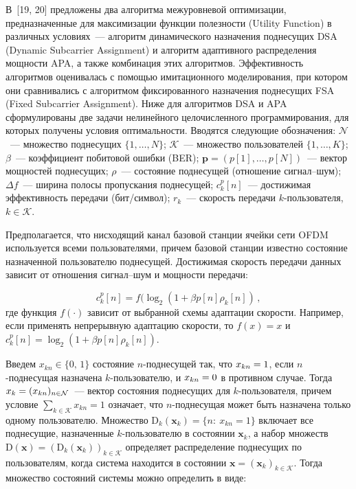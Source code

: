 \begin{multicols}{2}
  В~[19, 20] предложены два алгоритма межуровневой оптимизации, предназначенные для 
максимизации функции полезности (Utility Function) в различных условиях~--- алгоритм 
динамического назначения поднесущих DSA (Dynamic Subcarrier Assignment) и 
алгоритм адаптивного распределения мощности APA, а 
также комбинация этих алгоритмов. Эффективность алгоритмов оценивалась с помощью 
имитационного моделирования, при котором они сравнивались с алгоритмом 
фиксированного назначения поднесущих FSA (Fixed Subcarrier Assignment). Ниже для 
алгоритмов DSA и APA сформулированы две задачи нелинейного целочисленного 
программирования, для которых получены условия оптимальности. Вводятся следующие 
обозначения: $\mathcal{N}$~--- множество поднесущих $\{1,\ldots ,N\}$; 
$\mathcal{K}$~--- множество пользователей $\{1,\ldots ,K\}$; $\beta$~--- коэффициент 
побитовой ошибки (BER); $\mathbf{p}=(p[1],\ldots ,p[N])$~--- вектор мощностей\linebreak 
поднесущих; $\rho$~--- состояние поднесущей (отношение сиг\-нал--шум); $\Delta f$~--- 
ширина полосы пропускания поднесущей; $c_k^p[n]$~--- достижимая эффективность 
передачи (бит/символ); $r_k$~--- скорость \mbox{передачи} $k$-пользователя, $k\in\mathcal{K}$.
  
  Предполагается, что нисходящий канал базовой станции ячейки сети OFDM
используется всеми пользователями, причем базовой станции известно со\-сто\-яние 
назначенной пользователю поднесущей. Достижимая скорость передачи данных зависит 
от отношения сиг\-нал--шум и мощности передачи: 

\vspace*{4pt}

\noindent
$$
c_k^p[n]= f(\log_2(1+\beta 
p[n]\rho_k[n])\,,
$$
где функция $f(\cdot)$ зависит от выбранной схемы адап\-та\-ции скорости. 
Например, если применять непрерывную адаптацию скорости, то $f(x)=x$ и 
$c_k^p[n]=\log_2(1+\beta p[n]\rho_k[n])$.
  
  Введем $x_{kn}\in \{0,\,1\}$ состояние $n$-поднесущей так, что $x_{kn}\hm=1$, если 
  $n$-под\-не\-су\-щая назначена $k$-поль\-зо\-ва\-те\-лю, и $x_{kn}\hm=0$ в противном случае. Тогда 
$x_k\hm=(x_{kn})_{n\in\mathcal{N}}$~--- вектор состояния поднесущих для 
  $k$-пользователя, причем условие $\sum\limits_{k\in\mathcal{K}} x_{kn}=1$ означает, 
что $n$-поднесущая может быть назначена только одному пользователю. Множество 
$\mathrm{D}_k(\mathbf{x}_k) =\{n:\ x_{kn}=1\}$ включает все поднесущие, назначенные 
$k$-пользователю в состоянии $\mathbf{x}_k$, а набор множеств 
$\mathrm{D}(\mathbf{x})=(\mathrm{D}_k (\mathbf{x}_k))_{k\in \mathcal{K}}$ определяет 
распределение поднесущих по пользователям, когда система находится в состоянии 
$\mathbf{x}=(\mathbf{x}_k)_{k\in\mathcal{K}}$. Тогда множество состояний системы 
можно определить в виде:


\end{multicols}
